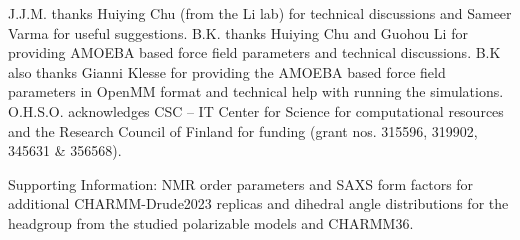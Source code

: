 \documentclass[journal=jctcce,manuscript=article,layout=singlecolumn]{achemso}
\begin{document}

\begin{acknowledgement}
J.J.M. thanks Huiying Chu (from the Li lab) for technical discussions and Sameer Varma for useful suggestions.
B.K. thanks Huiying Chu and Guohou Li for providing AMOEBA based force field parameters and technical discussions. B.K also thanks Gianni Klesse for providing the AMOEBA based force field parameters in OpenMM format and technical help with running the simulations.
O.H.S.O. acknowledges CSC -- IT Center for Science for computational resources and the Research Council of Finland for funding (grant nos. 315596, 319902, 345631 \& 356568).

\end{acknowledgement}

\begin{suppinfo}
Supporting Information: NMR order parameters and SAXS form factors for additional CHARMM-Drude2023 replicas and dihedral angle distributions for the headgroup from the studied polarizable models and CHARMM36.
\end{suppinfo}
\end{document}
